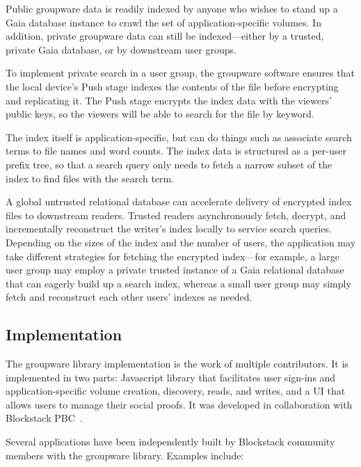 Public groupware data is readily indexed by anyone who wishes to stand up a
Gaia database instance to crawl the set of application-specific
volumes. In addition, private groupware data can still be indexed---either by a
trusted, private Gaia database, or by downstream user groups.

To implement private search in a user group,
the groupware software ensures that the local device's Push
stage indexes the contents of the file before encrypting and replicating it.
The Push stage encrypts the index data with the viewers' public keys, so
the viewers will be able to search for the file by keyword.

The index itself is application-specific, but can do things such as
associate search terms to file names and word counts.
The index data is structured as a per-user prefix tree, so
that a search query only needs to fetch a narrow subset of the index to find
files with the search term.

A global untrusted relational database can accelerate delivery of encrypted
index files to downstream readers.  Trusted readers asynchronously fetch,
decrypt, and incrementally reconstruct the writer's index locally to service
search queries.  Depending on the sizes of the index and the number of users,
the application may take different strategies for fetching the encrypted
index---for example, a large user group may employ a private trusted instance of
a Gaia relational database that can eagerly build up a search index, whereas a
small user group may simply fetch and reconstruct each other users' indexes as
needed.

\subsection{Implementation}

The groupware library implementation is the work of multiple contributors.
It is implemented in two parts: Javascript library that facilitates user
sign-ins and application-specific volume creation, discovery, reads, and writes,
and a UI that allows users to manage their social proofs.
It was developed in collaboration with Blockstack PBC~\cite{blockstack-pbc}.

Several applications have been independently built by Blockstack community members
with the groupware library.  Examples include:

